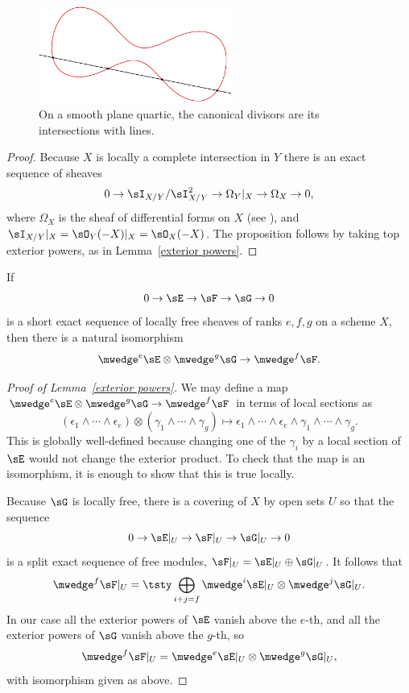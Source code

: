 \begin{figure}
\centerline{\includegraphics[width=2.5in]{"main/Fig02-1"}}
\caption{On a smooth plane quartic, the canonical divisors are its
  intersections with lines.
}\label{canonical of quartic}
\end{figure}


\begin{proof}
 Because $X$ is locally a complete intersection in $Y$ there is an exact sequence of sheaves
 $$
0\to  \sI_{X/Y}/\sI_{X/Y}^{2} \to \Omega_{Y}| _{X} \to \Omega_{X} \to 0
,
 $$
 where $\Omega_{X}$ is the sheaf of differential forms on $X$ (see \cite[Proposition 16.3]{Eisenbud95}), and
$ \sI_{X/Y}|_{X} = \sO_{Y}(-X)|_{X} = \sO_{X}(-X)$. The proposition
follows by taking top exterior powers,
%
as in Lemma~\ref{exterior powers}.
\end{proof}

\begin{lemma}\label{exterior powers}
 If 
$$
0\to \sE \to \sF\to \sG \to 0
$$
is a short exact sequence of locally free sheaves of ranks $e,f,g$ 
 on a scheme $X$, then there is a natural
isomorphism 
$$
\mwedge^e\sE \otimes \mwedge^g \sG \to \mwedge^f\sF.
$$
\end{lemma}

\begin{proof}[Proof of Lemma~\ref{exterior powers}]
 We may define a map
$
\mwedge^e\sE \otimes \mwedge^g \sG \to \mwedge^f\sF
$
in terms of local sections as
$$
(\epsilon_1\wedge\cdots \wedge \epsilon_e) \otimes (\gamma_1\wedge\cdots\wedge \gamma_g)
\mapsto \epsilon_1\wedge\cdots \wedge \epsilon_e\wedge\gamma_1\wedge\cdots\wedge \gamma_g.
$$
This is globally well-defined because changing one of the $\gamma_i$ by a local section of $\sE$ would not
change the exterior product.
To check that the map is an isomorphism, it is enough to show that this is true locally.

Because $\sG$ is locally free, there is a covering of $X$ by open sets $U$
so that the sequence
$$
0\to \sE|_U \to \sF|_U\to \sG|_U \to 0
$$
is a split exact sequence of free modules, $\sF|_U = \sE|_U\oplus \sG|_U$.
It follows that
$$
\mwedge^f\sF|_U = 
\tsty\bigoplus\limits_{i+j = f} \mwedge^i \sE|_U \otimes \mwedge^j\sG|_U.
$$
In our case all the exterior powers of $\sE$ vanish above the $e$-th, and all the 
exterior powers of $\sG$ vanish above the $g$-th, so 
$$
\mwedge^f\sF|_U =  \mwedge^e \sE|_U \otimes \mwedge^g\sG|_U,
$$
with isomorphism given as above.
\end{proof}


